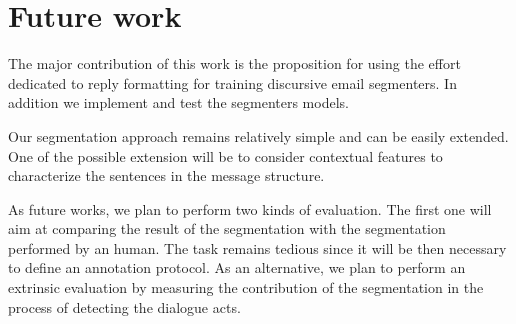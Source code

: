 

\section{Future work}
\label{sec:futureWork}

The major contribution of this work is the proposition for using the effort dedicated to reply formatting for training discursive email segmenters. 
In addition we implement and test the segmenters models. 

Our segmentation approach remains relatively simple and can be easily extended. One of the possible extension will be to consider contextual features to characterize the sentences in the message structure.

As future works, we plan to perform two kinds of evaluation. The first one will aim at comparing the result of the segmentation with the segmentation performed by an human. 
The task remains tedious since it will be then necessary to define an annotation protocol.
As an alternative, we plan to perform an extrinsic evaluation by measuring the contribution of the segmentation in the process of detecting the dialogue acts.

